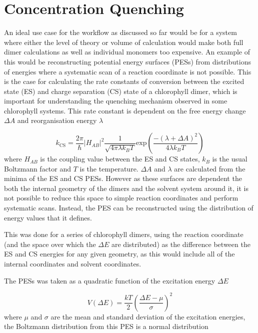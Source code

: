 \afterpartskip

\section{Concentration Quenching}
An ideal use case for the workflow as discussed so far would be for a system where
either the level of theory or volume of calculation would make both full dimer calculations
as well as individual monomers too expensive. An example of this would be reconstructing
potential energy surfaces (PESs) from distributions of energies where a systematic
scan of a reaction coordinate is not possible. This is the case for calculating
the rate constants of conversion between the excited state (ES) and charge separation
(CS) state of a chlorophyll dimer, which is important for understanding the quenching
mechanism observed in some chlorophyll systems. This rate constant is dependent
on the free energy change $\Delta A$ and reorganisation energy $\lambda$

\begin{equation}
    k_{\text{CS}} = \frac{2\pi}{\hbar} \left\lvert H_{AB} \right\rvert^2 \frac{1}{\sqrt{4 \pi \lambda k_B T}}\text{exp}\left(\frac{-\left(\lambda + \Delta A\right)^2}{4 \lambda k_B T}\right)
\end{equation}
%
where $H_{AB}$ is the coupling value between the ES and CS states, $k_B$ is the 
usual Boltzmann factor and $T$ is the temperature. $\Delta A$ and $\lambda$ are
calculated from the minima of the ES and CS PESs. However as these surfaces are 
dependent the both the internal geometry of the dimers and the solvent system around
it, it is not possible to reduce this space to simple reaction coordinates and 
perform systematic scans. Instead, the PES can be reconstructed using the distribution 
of energy values that it defines. 

This was done for a series of chlorophyll dimers, using the reaction coordinate 
(and the space over which the $\Delta E$ are  distributed) as the difference between
the ES and CS energies for any given geometry, as this would include all of the
internal coordinates and solvent coordinates.

The PESs was taken as a quadratic function of the excitation energy $\Delta E$

\begin{equation}
    V\left(\Delta E\right) = \frac{kT}{2} \left( \frac{\Delta E - \mu}{\sigma}\right)^2
\end{equation}
%
where $\mu$ and $\sigma$ are the mean and standard deviation of the excitation energies,
the Boltzmann distribution from this PES is a normal distribution

